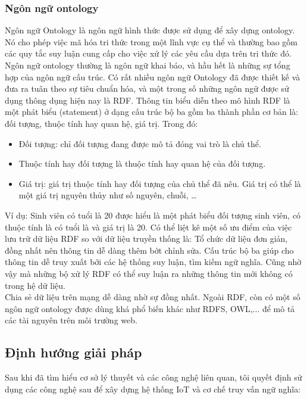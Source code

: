 \subsubsection{Ngôn ngữ ontology}
Ngôn ngữ Ontology là ngôn ngữ hình thức được sử dụng để xây dựng ontology. Nó cho phép việc mã hóa tri thức trong một lĩnh vực cụ thể và thường bao gồm các quy tắc suy luận cung cấp cho việc xử lý các yêu cầu dựa trên tri thức đó. Ngôn ngữ ontology thường là ngôn ngữ khai báo, và hầu hết là những sự tổng hợp của ngôn ngữ cấu trúc. Có rất nhiều ngôn ngữ Ontology đã được thiết kế và đưa ra tuân theo sự tiêu chuẩn hóa, và một trong số những ngôn ngữ được sử dụng thông dụng hiện nay là RDF. Thông tin biểu diễn theo mô hình RDF là một phát biểu (statement) ở dạng cấu trúc bộ ba gồm ba thành phần cơ bản là: đối tượng, thuộc tính hay quan hệ, giá trị. Trong đó:
\begin{itemize}
	\item Đối tượng: chỉ đối tượng đang được mô tả đóng vai trò là chủ thể.
	\item Thuộc tính hay đối tượng là thuộc tính hay quan hệ của đối tượng.
	\item Giá trị: giá trị thuộc tính hay đối tượng của chủ thể đã nêu. Giá trị có thể là một giá trị nguyên thủy như số nguyên, chuỗi, …
\end{itemize}
Ví dụ: Sinh viên có tuổi là 20 được hiểu là một phát biểu đối tượng sinh viên, có thuộc tính là có tuổi là và giá trị là 20.
Có thể liệt kê một số ưu điểm của việc lưu trữ dữ liệu RDF so với dữ liệu truyền thống là: 
Tổ chức dữ liệu đơn giản, đồng nhất nên thông tin dễ dàng thêm bớt chỉnh sửa.
Cấu trúc bộ ba giúp cho thông tin dễ truy xuất bởi các hệ thống suy luận, tìm kiếm ngữ nghĩa. Cũng nhờ vậy mà những bộ xử lý RDF có thể suy luận ra những thông tin mới không có trong hệ dữ liệu. \\
Chia sẻ dữ liệu trên mạng dễ dàng nhờ sự đồng nhất. Ngoài RDF, còn có một số ngôn ngữ ontology được dùng khá phổ biến khác như RDFS, OWL,... để mô tả các tài nguyên trên môi trường web.

\subsection{Định hướng giải pháp}
Sau khi đã tìm hiểu cơ sở lý thuyết và các công nghệ liên quan, tôi quyết định sử dụng các công nghệ sau để xây dựng hệ thống IoT và cơ chế truy vấn ngữ nghĩa: 

